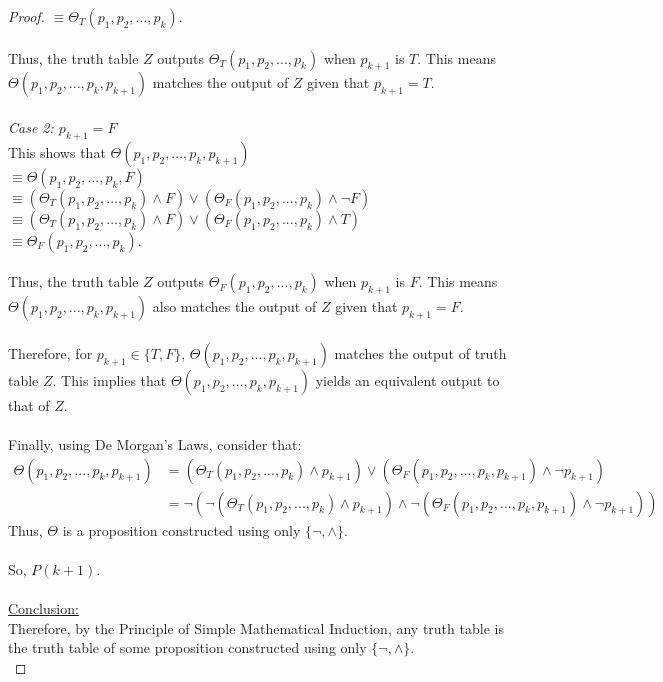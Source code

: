 \documentclass[12pt]{article}
\begin{document}
\begin{proof}
    $\equiv \Theta_T(p_1, p_2, ..., p_k)$. \\
    \\
    Thus, the truth table $Z$ outputs $\Theta_T(p_1, p_2, ..., p_k)$ when $p_{k+1}$ is $T$. This means $\Theta(p_1, p_2, ..., p_k, p_{k+1})$ matches the output of $Z$ given that $p_{k+1} = T$. \\
    \\
    \textit{Case 2: $p_{k+1} = F$} \\
    This shows that $\Theta(p_1, p_2, ..., p_k, p_{k+1})$ \\
    $\equiv \Theta(p_1, p_2, ..., p_k, F)$ \\
    $\equiv (\Theta_T(p_1, p_2, ..., p_k) \land F) \lor (\Theta_F(p_1, p_2, ..., p_k) \land \neg F)$ \\
    $\equiv (\Theta_T(p_1, p_2, ..., p_k) \land F) \lor (\Theta_F(p_1, p_2, ..., p_k) \land T)$ \\
    $\equiv \Theta_F(p_1, p_2, ..., p_k)$. \\
    \\
    Thus, the truth table $Z$ outputs $\Theta_F(p_1, p_2, ..., p_k)$ when $p_{k+1}$ is $F$. This means $\Theta(p_1, p_2, ..., p_k, p_{k+1})$ also matches the output of $Z$ given that $p_{k+1} = F$. \\
    \\
    Therefore, for $p_{k+1} \in \{T, F\}$, $\Theta(p_1, p_2, ..., p_k, p_{k+1})$ matches the output of truth table $Z$. This implies that $\Theta(p_1, p_2, ..., p_k, p_{k+1})$ yields an equivalent output to that of $Z$. \\
    \\
    Finally, using De Morgan's Laws, consider that: \\
    \begin{equation*}
        \begin{aligned}
            \Theta(p_1, p_2, ..., p_k, p_{k+1}) &= (\Theta_T(p_1, p_2, ..., p_k) \land p_{k+1}) \lor (\Theta_F(p_1, p_2, ..., p_k, p_{k+1}) \land \neg p_{k+1}) \\
            &= \neg (\neg (\Theta_T(p_1, p_2, ..., p_k) \land p_{k+1}) \land \neg (\Theta_F(p_1, p_2, ..., p_k, p_{k+1}) \land \neg p_{k+1}))
        \end{aligned}
    \end{equation*}
    Thus, $\Theta$ is a proposition constructed using only $\{\neg, \land\}$. \\
    \\
    So, $P(k + 1)$. \\
    \\    
    \underline{Conclusion:} \\
    Therefore, by the Principle of Simple Mathematical Induction, any truth table is the truth table of some proposition constructed using only $\{\neg, \land\}$. \\
\end{proof}
\end{document}
